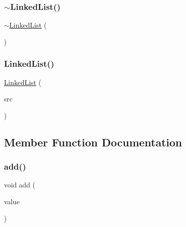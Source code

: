 \mbox{\label{classLinkedList_ab2cd0a10d50aeffd524b75b36fb2be05}} 
\subsubsection{\texorpdfstring{$\sim$\+Linked\+List()}{~LinkedList()}}
{\footnotesize\ttfamily $\sim$\mbox{\hyperlink{classLinkedList}{Linked\+List}} (\begin{DoxyParamCaption}{ }\end{DoxyParamCaption})\hspace{0.3cm}{\ttfamily [virtual]}}

\mbox{\label{classLinkedList_a1330add0e884cda7ab733040dc48c7ff}} 
\subsubsection{\texorpdfstring{Linked\+List()}{LinkedList()}\hspace{0.1cm}{\footnotesize\ttfamily [4/4]}}
{\footnotesize\ttfamily \mbox{\hyperlink{classLinkedList}{Linked\+List}} (\begin{DoxyParamCaption}\item[{const \mbox{\hyperlink{classLinkedList}{Linked\+List}}$<$ Value\+Type $>$ \&}]{src }\end{DoxyParamCaption})}



\subsection{Member Function Documentation}
\mbox{\label{classLinkedList_aa6249e9d60956ac91381e5040b77c0c6}} 
\subsubsection{\texorpdfstring{add()}{add()}}
{\footnotesize\ttfamily void add (\begin{DoxyParamCaption}\item[{Value\+Type}]{value }\end{DoxyParamCaption})}

